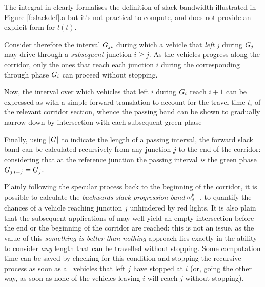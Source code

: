 The integral in  clearly formalises the definition of slack bandwidth illustrated in Figure \ref{f:slackdef}.a but it's not practical to compute, and does not provide an explicit form for $l(t)$.

Consider therefore the interval $G_{ji}$ during which a vehicle that \emph{left} $j$ during $G_{j}$ may drive through a \emph{subsequent} junction $i \geqslant j$. As the vehicles progress along the corridor, only the ones that reach each junction $i$ during the corresponding through phase $G_{i}$ can proceed without stopping.

Now, the interval over which vehicles that left $i$ during $G_{i}$ reach $i+1$ can be expressed as 
with a simple forward translation to account for the travel time $t_i$ of the relevant corridor section, whence the passing band can be shown to gradually narrow down by intersection with each subsequent green phase

Finally, using $|G_{}|$ to indicate the length of a passing interval, the forward slack band can be calculated recursively from any junction $j$ to the end of the corridor:
considering that at the reference junction the passing interval \emph{is} the green phase $G_{j\, i=j} = G_{j}$.


Plainly following the specular process back to the beginning of the corridor, it is possible to calculate the \emph{backwards slack progression band} $\omega_{j}^{\scriptstyle{b-}}$, to quantify the chances of a vehicle reaching junction $j$ unhindered by red lights. It is also plain that the subsequent applications of  may well yield an empty intersection before the end or the beginning of the corridor are reached: this is not an issue, as the value of this \emph{something-is-better-than-nothing} approach lies exactly in the ability to consider \emph{any} length that can be travelled without stopping. Some computation time can be saved by checking for this condition and stopping the recursive process  as soon as all vehicles that left $j$ have stopped at $i$ (or, going the other way, as soon as none of the vehicles leaving $i$ will reach $j$ without stopping).

